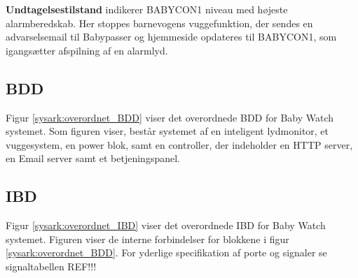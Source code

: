 \textbf{Undtagelsestilstand} indikerer BABYCON1 niveau med højeste alarmberedskab. Her stoppes barnevogens vuggefunktion, der sendes en advarselsemail til Babypasser og hjemmeside opdateres til BABYCON1, som igangsætter afspilning af en alarmlyd. 


\subsection{BDD}
Figur \ref{sysark:overordnet_BDD} viser det overordnede BDD for Baby Watch systemet. Som figuren viser, består systemet af en inteligent lydmonitor, et vuggesystem, en power blok, samt en controller, der indeholder en HTTP server, en Email server samt et betjeningspanel.


\subsection{IBD}

Figur \ref{sysark:overordnet_IBD} viser det overordnede IBD for Baby Watch systemet.  Figuren viser de interne forbindelser for blokkene i figur \ref{sysark:overordnet_BDD}. For yderlige specifikation af porte og signaler se signaltabellen REF!!!




